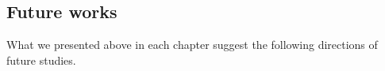 
\subsection*{Future works}

What we presented above in each chapter suggest the following directions of future studies.











